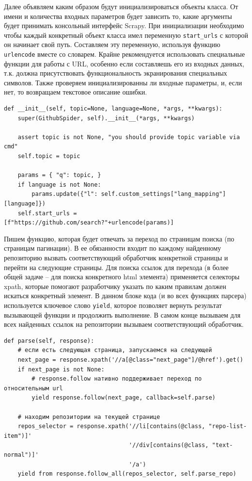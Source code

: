 Далее объявляем каким образом будут инициализироваться объекты класса. От имени
и количества входных параметров будет зависить то, какие аргументы будет
принимать консольный интерфейс Scrapy. При инициализации необходимо чтобы каждый
конкретный объект класса имел переменную \verb|start_urls| с которой он начинает
свой путь. Составляем эту переменную, используя функцию \verb|urlencode| вместе
со словарем. Крайне рекомендуется использовать специальные функции для работы с
URL, особенно если составляешь его из входных данных, т.к. должна присутствовать
функциональность экранирования специальных символов. Также проверяем
инициализированны ли входные параметры, и, если нет, то возвращаем текстовое
описание ошибки.
\begin{verbatim}
def __init__(self, topic=None, language=None, *args, **kwargs):
    super(GithubSpider, self).__init__(*args, **kwargs)

    assert topic is not None, "you should provide topic variable via cmd"
    self.topic = topic

    params = { "q": topic, }
    if language is not None:
        params.update({"l": self.custom_settings["lang_mapping"][language]})
    self.start_urls = [f"https://github.com/search?"+urlencode(params)]
\end{verbatim}

Пишем функцию, которая будет отвечать за переход по страницам поиска (по
страницам пагинации). В ее обязанности входит по каждому найденному репозиторию
вызвать соответствующий обработчик конкретной страницы и перейти на следующие
страницы. Для поиска ссылок для перехода (в более общей задаче -- для поиска
конкретного html элемента) применяется селекторы xpath, которые помогают
разработчику указать по каким правилам должен искаться конкретный элемент. В
данном блоке кода (и во всех функциях парсера) используется ключевое слово
\verb|yield|, которое позволяет вернуть результат вызывающей функции и
продолжить выполнение. В самом конце вызываем для всех найденных ссылок на
репозитории вызываем соответствующий обработчик.
\begin{verbatim}
def parse(self, response):
    # если есть следующая страница, запускаемся на следующей
    next_page = response.xpath('//a[@class="next_page"]/@href').get()
    if next_page is not None:
        # response.follow нативно поддерживает переход по относительным url
        yield response.follow(next_page, callback=self.parse)

    # находим репозитории на текущей странице
    repos_selector = response.xpath('//li[contains(@class, "repo-list-item")]'
                                    '//div[contains(@class, "text-normal")]'
                                    '/a')
    yield from response.follow_all(repos_selector, self.parse_repo)
\end{verbatim}

